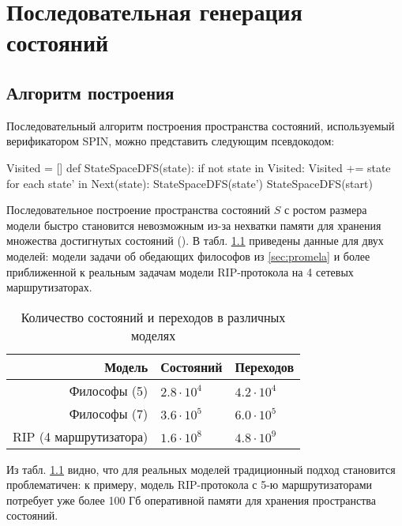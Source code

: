 \cite{BitHash1}\chapter{Последовательная генерация состояний}
\label{sec:seq-statespace}

\section{Алгоритм построения}
\label{sec:seq-algo}

Последовательный алгоритм построения пространства состояний,
используемый верификатором SPIN, можно представить следующим
псевдокодом:

\begin{CodeBlock}
Visited = []
def StateSpaceDFS(state):
    if not state in Visited:
        Visited += state
        for each state' in Next(state):
            StateSpaceDFS(state')
StateSpaceDFS(start)
\end{CodeBlock}

Последовательное построение пространства состояний $S$ с ростом размера модели
быстро становится невозможным из-за нехватки памяти для хранения множества
достигнутых состояний (). В табл. \ref{tab:models-statecount}
приведены данные для двух моделей: модели задачи об обедающих философов из
\ref{sec:promela} и более приближенной к реальным задачам модели RIP-протокола
на 4 сетевых маршрутизаторах.

\begin{table}
  \centering
  \begin{tabular}{|r|l|l|}
    \hline
    Модель                  & Состояний         & Переходов       \\
    \hline
    Философы (5)            & $2.8 \cdot 10^4$  & $4.2 \cdot 10^4$ \\
    Философы (7)            & $3.6 \cdot 10^5$  & $6.0 \cdot 10^5$ \\
    RIP (4 маршрутизатора)  & $1.6 \cdot 10^8$  & $4.8 \cdot 10^9$ \\
    \hline
  \end{tabular}
  \caption{Количество состояний и переходов в различных моделях}
\label{tab:models-statecount}
\end{table}

Из табл. \ref{tab:models-statecount} видно, что для реальных моделей
традиционный подход становится проблематичен: к примеру, модель
RIP-протокола с 5-ю маршрутизаторами потребует уже более 100 Гб
оперативной памяти для хранения пространства состояний. 

